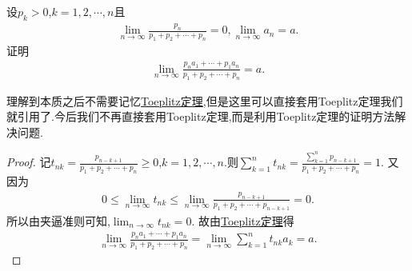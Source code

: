 \documentclass[../../main.tex]{subfiles}%
\begin{document}
\begin{example}
设\(p_k > 0\),\(k = 1,2,\cdots,n\)且
\begin{align*}
\lim_{n \to \infty} \frac{p_n}{p_1 + p_2 + \cdots + p_n} = 0,\lim_{n \to \infty} a_n = a.
\end{align*}
证明
\begin{align*}
\lim_{n \to \infty} \frac{p_n a_1 + \cdots + p_1 a_n}{p_1 + p_2 + \cdots + p_n} = a.   
\end{align*}
\end{example}
\begin{note}
理解到本质之后不需要记忆\hyperref[theorem:Toeplitz定理]{Toeplitz定理},但是这里可以直接套用Toeplitz定理我们就引用了.今后我们不再直接套用Toeplitz定理,而是利用Toeplitz定理的证明方法解决问题.
\end{note}
\begin{proof}

记\(t_{nk} = \frac{p_{n - k + 1}}{p_1 + p_2 + \cdots + p_n} \geqslant  0\),\(k = 1,2,\cdots,n\).则\(\sum\limits_{k = 1}^{n} t_{nk} = \frac{\sum\limits_{k = 1}^{n} p_{n - k + 1}}{p_1 + p_2 + \cdots + p_n} = 1\).
又因为
\begin{align*}
0 \leqslant  \lim_{n \to \infty} t_{nk} \leqslant  \lim_{n \to \infty} \frac{p_{n - k + 1}}{p_1 + p_2 + \cdots + p_{n - k + 1}} = 0.
\end{align*}
所以由夹逼准则可知,$\lim_{n \to \infty} t_{nk}=0$.
故由\hyperref[theorem:Toeplitz定理]{Toeplitz定理}得
\begin{align*}
\lim_{n \to \infty} \frac{p_n a_1 + \cdots + p_1 a_n}{p_1 + p_2 + \cdots + p_n}=\lim_{n \to \infty} \sum\limits_{k = 1}^{n} t_{nk} a_k = a .
\end{align*}

\end{proof}
\end{document}
